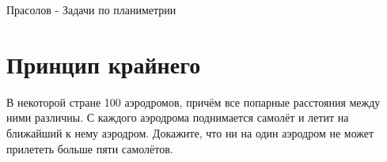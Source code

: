 \documentclass[11pt, a4paper]{template}
\begin{document}
\begin{titlepage}
  \begin{center}
	\Huge{Прасолов - Задачи по планиметрии}
  \end{center}
\end{titlepage}

\chapter{Принцип крайнего}

\begin{exercise}
В некоторой стране 100 аэродромов, причём все попарные расстояния между ними различны. С каждого аэродрома поднимается самолёт и летит на ближайший к нему аэродром. Докажите, что ни на один аэродром не может прилететь больше пяти самолётов.
\end{exercise}
\end{document}
